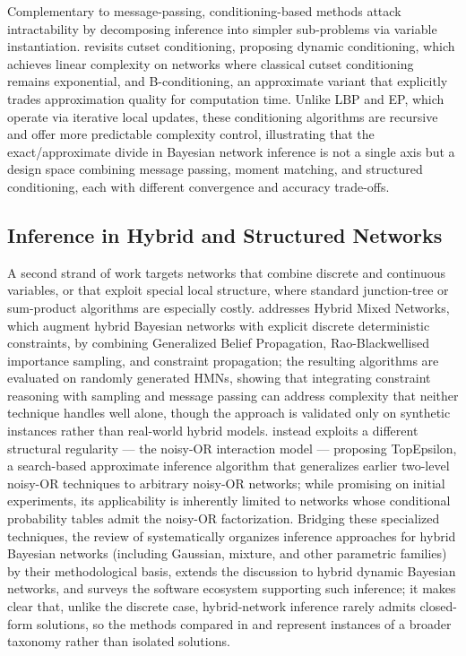 Complementary to message-passing, conditioning-based methods attack intractability by decomposing inference into simpler sub-problems via variable instantiation. \cite{darwiche2013conditioning} revisits cutset conditioning, proposing dynamic conditioning, which achieves linear complexity on networks where classical cutset conditioning remains exponential, and B-conditioning, an approximate variant that explicitly trades approximation quality for computation time. Unlike LBP and EP, which operate via iterative local updates, these conditioning algorithms are recursive and offer more predictable complexity control, illustrating that the exact/approximate divide in Bayesian network inference is not a single axis but a design space combining message passing, moment matching, and structured conditioning, each with different convergence and accuracy trade-offs.

\subsection{Inference in Hybrid and Structured Networks}
A second strand of work targets networks that combine discrete and continuous variables, or that exploit special local structure, where standard junction-tree or sum-product algorithms are especially costly. \cite{gogate2012approximate} addresses Hybrid Mixed Networks, which augment hybrid Bayesian networks with explicit discrete deterministic constraints, by combining Generalized Belief Propagation, Rao-Blackwellised importance sampling, and constraint propagation; the resulting algorithms are evaluated on randomly generated HMNs, showing that integrating constraint reasoning with sampling and message passing can address complexity that neither technique handles well alone, though the approach is validated only on synthetic instances rather than real-world hybrid models. \cite{huang2013efficient} instead exploits a different structural regularity --- the noisy-OR interaction model --- proposing TopEpsilon, a search-based approximate inference algorithm that generalizes earlier two-level noisy-OR techniques to arbitrary noisy-OR networks; while promising on initial experiments, its applicability is inherently limited to networks whose conditional probability tables admit the noisy-OR factorization. Bridging these specialized techniques, the review of \cite{salmeron2018review} systematically organizes inference approaches for hybrid Bayesian networks (including Gaussian, mixture, and other parametric families) by their methodological basis, extends the discussion to hybrid dynamic Bayesian networks, and surveys the software ecosystem supporting such inference; it makes clear that, unlike the discrete case, hybrid-network inference rarely admits closed-form solutions, so the methods compared in \cite{gogate2012approximate} and \cite{huang2013efficient} represent instances of a broader taxonomy rather than isolated solutions.

